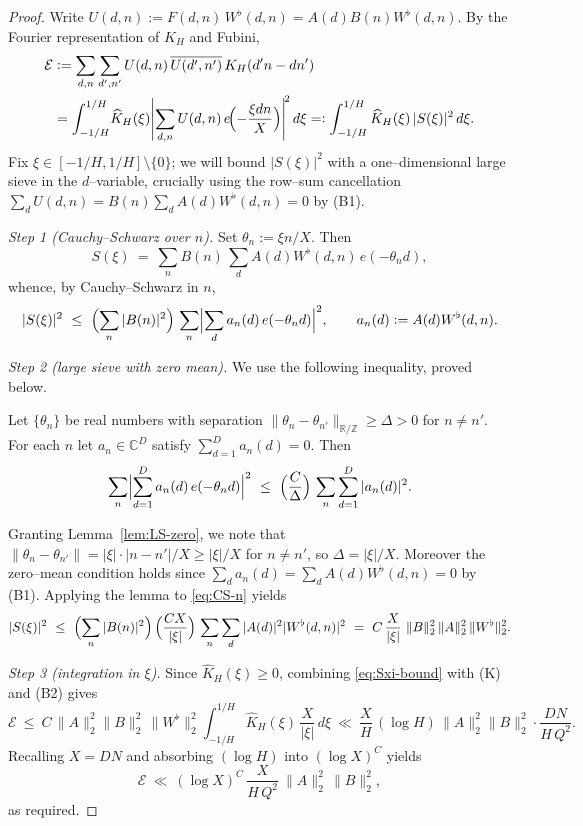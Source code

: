 \begin{proof}
Write $U(d,n):=F(d,n)\,W^\flat(d,n)=A(d)B(n)W^\flat(d,n)$. By the Fourier representation of $K_H$ and Fubini,
\begin{align*}
\mathcal E
&:=\sum_{d,n}\sum_{d',n'} U(d,n)\,\overline{U(d',n')}\,K_H(d'n-dn')
\\
&=\int_{-1/H}^{1/H}\!\widehat K_H(\xi)
\Biggl|\sum_{d,n} U(d,n)\,e\!\Bigl(-\frac{\xi dn}{X}\Bigr)\Biggr|^{\!2}\,d\xi
=: \int_{-1/H}^{1/H}\widehat K_H(\xi)\,|S(\xi)|^2\,d\xi .
\end{align*}
Fix $\xi\in[-1/H,1/H]\setminus\{0\}$; we will bound $|S(\xi)|^2$ with a one--dimensional large sieve in the $d$--variable, crucially using the row--sum cancellation $\sum_{d}U(d,n)=B(n)\sum_{d}A(d)W^\flat(d,n)=0$ by \textnormal{(B1)}.

\smallskip
\emph{Step 1 (Cauchy--Schwarz over $n$).} Set $\theta_n:=\xi n/X$. Then
\[
S(\xi)\ =\ \sum_{n} B(n)\, \sum_{d} A(d)W^\flat(d,n)\,e(-\theta_n d),
\]
whence, by Cauchy--Schwarz in $n$,
\begin{equation}\label{eq:CS-n}
|S(\xi)|^2\ \le\ \Bigl(\sum_{n}|B(n)|^2\Bigr)\,
\sum_{n}\Bigl|\sum_{d} a_n(d)\,e(-\theta_n d)\Bigr|^2,
\qquad a_n(d):=A(d)W^\flat(d,n).
\end{equation}

\emph{Step 2 (large sieve with zero mean).} We use the following inequality, proved below.

\begin{lemma}\label{lem:LS-zero}
Let $\{\theta_n\}$ be real numbers with separation $\|\theta_n-\theta_{n'}\|_{\mathbb R/\mathbb Z}\ge \Delta>0$ for $n\neq n'$. For each $n$ let $a_n\in\mathbb C^{D}$ satisfy $\sum_{d=1}^{D} a_n(d)=0$. Then
\[
\sum_{n}\Bigl|\sum_{d=1}^{D} a_n(d)\,e(-\theta_n d)\Bigr|^2
\ \le\ \Bigl(\frac{C}{\Delta}\Bigr)\,\sum_{n}\sum_{d=1}^{D} |a_n(d)|^2 .
\]
\end{lemma}

Granting Lemma~\ref{lem:LS-zero}, we note that $\|\theta_n-\theta_{n'}\|=|\xi|\cdot |n-n'|/X\ge |\xi|/X$ for $n\neq n'$, so $\Delta=|\xi|/X$. Moreover the zero--mean condition holds since $\sum_d a_n(d)=\sum_d A(d)W^\flat(d,n)=0$ by \textnormal{(B1)}. Applying the lemma to \eqref{eq:CS-n} yields
\begin{equation}\label{eq:Sxi-bound}
|S(\xi)|^2\ \le\ \Bigl(\sum_{n}|B(n)|^2\Bigr)\,
\Bigl(\frac{C X}{|\xi|}\Bigr)\, \sum_{n}\sum_{d}|A(d)|^2|W^\flat(d,n)|^2
\ =\ C\,\frac{X}{|\xi|}\ \|B\|_2^2\,\|A\|_2^2\,\|W^\flat\|_2^2.
\end{equation}

\emph{Step 3 (integration in $\xi$).} Since $\widehat K_H(\xi)\ge0$, combining \eqref{eq:Sxi-bound} with \textnormal{(K)} and \textnormal{(B2)} gives
\[
\mathcal E
\ \le\ C\,\|A\|_2^2\|B\|_2^2\,\|W^\flat\|_2^2
\int_{-1/H}^{1/H}\widehat K_H(\xi)\,\frac{X}{|\xi|}\,d\xi
\ \ll\ \frac{X}{H}\,(\log H)\, \|A\|_2^2\|B\|_2^2\cdot \frac{DN}{H\,Q^{2}}.
\]
Recalling $X=DN$ and absorbing $(\log H)$ into $(\log X)^C$ yields
\[
\mathcal E\ \ll\ (\log X)^C\,\frac{X}{H\,Q^{2}}\ \|A\|_2^2\,\|B\|_2^2,
\]
as required.
\end{proof}

